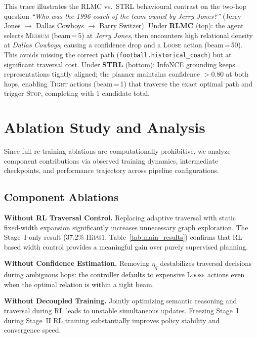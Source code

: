 \documentclass[10pt,conference]{IEEEtran}
\begin{document}
This trace illustrates the RLMC vs.\ STRL behavioural contrast on the two-hop question \textit{``Who was the 1996 coach of the team owned by Jerry Jones?''} (Jerry Jones $\to$ Dallas Cowboys $\to$ Barry Switzer). Under \textbf{RLMC} (top): the agent selects \textsc{Medium} (beam\,=\,5) at \textit{Jerry Jones}, then encounters high relational density at \textit{Dallas Cowboys}, causing a confidence drop and a \textsc{Loose} action (beam\,=\,50). This avoids missing the correct path (\texttt{football.historical\_coach}) but at significant traversal cost. Under \textbf{STRL} (bottom): InfoNCE grounding keeps representations tightly aligned; the planner maintains confidence $>0.80$ at both hops, enabling \textsc{Tight} actions (beam\,=\,1) that traverse the exact optimal path and trigger \textsc{Stop}, completing with 1 candidate total.

\section{Ablation Study and Analysis}
\label{app:ablation}

Since full re-training ablations are computationally prohibitive, we analyze component contributions via observed training dynamics, intermediate checkpoints, and performance trajectory across pipeline configurations.

\subsection{Component Ablations}

\textbf{Without RL Traversal Control.} Replacing adaptive traversal with static fixed-width expansion significantly increases unnecessary graph exploration. The Stage~I-only result (37.2\% Hit@1, Table~\ref{tab:main_results}) confirms that RL-based width control provides a meaningful gain over purely supervised planning.

\textbf{Without Confidence Estimation.} Removing $\eta_q$ destabilizes traversal decisions during ambiguous hops: the controller defaults to expensive \textsc{Loose} actions even when the optimal relation is within a tight beam.

\textbf{Without Decoupled Training.} Jointly optimizing semantic reasoning and traversal during RL leads to unstable simultaneous updates. Freezing Stage~I during Stage~II RL training substantially improves policy stability and convergence speed.
\end{document}
